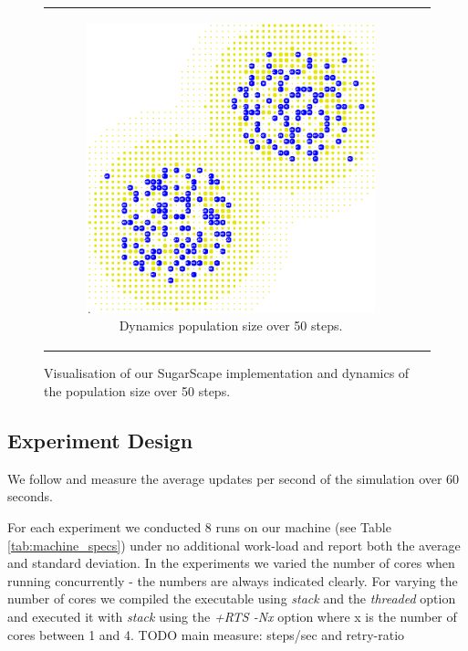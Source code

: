 \begin{figure}
\begin{center}
\begin{tabular}{c c}
		\begin{subfigure}[b]{0.4\textwidth}
			\centering
			\includegraphics[width=1\textwidth, angle=0]{./fig/sugarscape/vis/sugarscape_t60_dynamics.png}
			\caption{Dynamics population size over 50 steps.}
			\label{fig:vis_sugarscape_t50_dynamics}
		\end{subfigure}
	\end{tabular}
	
	\caption{Visualisation of our SugarScape implementation and dynamics of the population size over 50 steps.}
	\label{fig:vis_sugarscape}
\end{center}
\end{figure}

\subsection{Experiment Design}
We follow \cite{lysenko_framework_2008} and measure the average updates per second of the simulation over 60 seconds.

For each experiment we conducted 8 runs on our machine (see Table \ref{tab:machine_specs}) under no additional work-load and report both the average and standard deviation. In the experiments we varied the number of cores when running concurrently - the numbers are always indicated clearly. For varying the number of cores we compiled the executable using \textit{stack} and the \textit{threaded} option and executed it with \textit{stack} using the \textit{+RTS -Nx} option where x is the number of cores between 1 and 4. TODO main measure: steps/sec and retry-ratio

